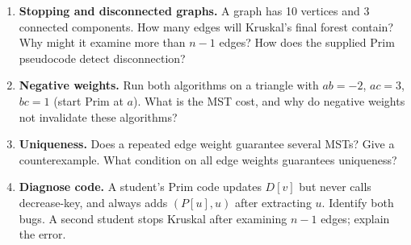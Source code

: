 \documentclass[11pt,letterpaper]{article}
\begin{document}
\begin{enumerate}
 \item \textbf{Stopping and disconnected graphs.} A graph has 10 vertices and 3 connected components. How many edges will Kruskal's final forest contain? Why might it examine more than $n-1$ edges? How does the supplied Prim pseudocode detect disconnection?
 \item \textbf{Negative weights.} Run both algorithms on a triangle with $ab=-2$, $ac=3$, $bc=1$ (start Prim at $a$). What is the MST cost, and why do negative weights not invalidate these algorithms?
 \item \textbf{Uniqueness.} Does a repeated edge weight guarantee several MSTs? Give a counterexample. What condition on all edge weights guarantees uniqueness?
 \item \textbf{Diagnose code.} A student's Prim code updates $D[v]$ but never calls decrease-key, and always adds $(P[u],u)$ after extracting $u$. Identify both bugs. A second student stops Kruskal after examining $n-1$ edges; explain the error.
\end{enumerate}
\endgroup

\newpage
\end{document}
